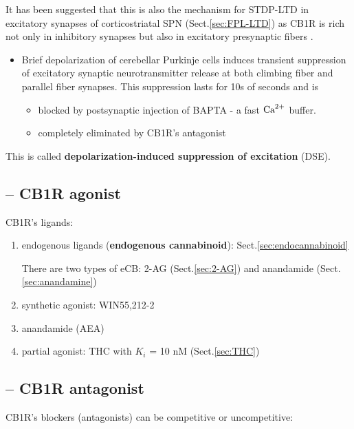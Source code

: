 It has been suggested that this is also the mechanism for STDP-LTD in excitatory
synapses of corticostriatal SPN (Sect.\ref{sec:FPL-LTD}) as CB1R is rich not
only in inhibitory synapses but also in excitatory presynaptic fibers
\citep{kano2002}.
\begin{itemize}
  \item Brief depolarization of cerebellar Purkinje cells induces transient
  suppression of excitatory synaptic neurotransmitter release at both climbing
  fiber and parallel fiber synapses. This suppression lasts for 10s of seconds
  and is  
  \begin{itemize}
    \item blocked by postsynaptic injection of BAPTA - a fast ${\text{Ca}^{2+}}$
    buffer.
    \item completely eliminated by CB1R's antagonist
  \end{itemize}
  
  
\end{itemize}
This is called {\bf depolarization-induced suppression of excitation} (DSE).


\subsection{-- CB1R agonist}

CB1R's ligands:
\begin{enumerate}
  
  \item endogenous ligands ({\bf endogenous cannabinoid}): Sect.\ref{sec:endocannabinoid}
  
There are two types of eCB: 2-AG (Sect.\ref{sec:2-AG}) and anandamide
(Sect.\ref{sec:anandamine})
    
  \item synthetic agonist: WIN55,212-2
  
  \item anandamide (AEA)
  
  \item partial agonist: THC with $K_i$ = 10 nM (Sect.\ref{sec:THC})
  
  
\end{enumerate}


\subsection{-- CB1R antagonist}

CB1R's blockers (antagonists) can be competitive or
uncompetitive:

